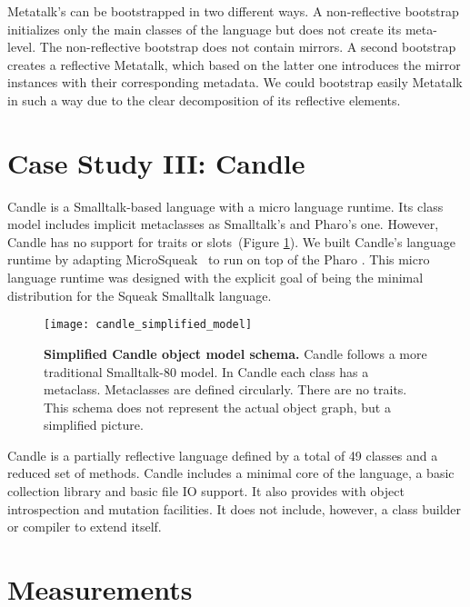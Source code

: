 Metatalk's can be bootstrapped in two different ways. A non-reflective bootstrap initializes only the main classes of the language but does not create its meta-level. The non-reflective bootstrap does not contain mirrors. A second bootstrap creates a reflective Metatalk, which based on the latter one introduces the mirror instances with their corresponding metadata. We could bootstrap easily Metatalk in such a way due to the clear decomposition of its reflective elements. 

\section{Case Study III: Candle} \label{sec:bootstrap_candle}

Candle is a Smalltalk-based language with a micro language runtime. Its class model includes implicit metaclasses as Smalltalk's and Pharo's one. However, Candle has no support for traits or slots~(Figure \ref{fig:candle_simplified_model}). We built Candle's language runtime by adapting MicroSqueak~\cite{Malo11a} to run on top of the Pharo \VM. This micro language runtime was designed with the explicit goal of being the minimal distribution for the Squeak Smalltalk language.

\begin{figure}[ht]
\center
\texttt{[image: candle\_simplified\_model]}
\caption{\textbf{Simplified Candle object model schema.} Candle follows a more traditional Smalltalk-80 model. In Candle each class has a metaclass. Metaclasses are defined circularly. There are no traits. This schema does not represent the actual object graph, but a simplified picture.\label{fig:candle_simplified_model}}
\end{figure}


Candle is a partially reflective language defined by a total of 49 classes and a reduced set of methods. Candle includes a minimal core of the language, a basic collection library and basic file IO support. It also provides with object introspection and mutation facilities. It does not include, however, a class builder or compiler to extend itself.%

\section{Measurements}


